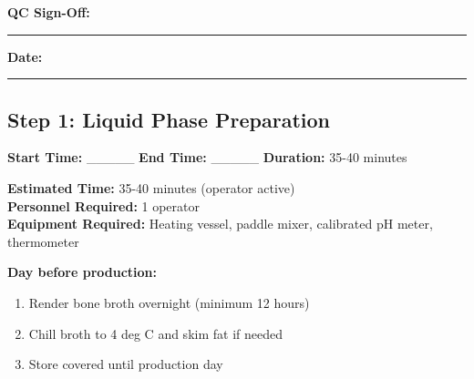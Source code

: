 \vspace{1em}
\noindent\textbf{QC Sign-Off:} \rule{5cm}{0.4pt} \hspace{1cm} \textbf{Date:} \rule{3cm}{0.4pt}


\subsection*{Step 1: Liquid Phase Preparation}

\textbf{Start Time:} \_\_\_\_\_ \hspace{1cm} \textbf{End Time:} \_\_\_\_\_ \hspace{1cm} \textbf{Duration:} 35-40 minutes

\vspace{0.5em}

\textbf{Estimated Time:} 35-40 minutes (operator active) \\
\textbf{Personnel Required:} 1 operator \\
\textbf{Equipment Required:} Heating vessel, paddle mixer, calibrated pH meter, thermometer

\vspace{0.5em}
\textbf{Day before production:}
\begin{enumerate}[leftmargin=1.5em]
\item Render bone broth overnight (minimum 12 hours)
\item Chill broth to 4 deg C and skim fat if needed
\item Store covered until production day
\end{enumerate}

